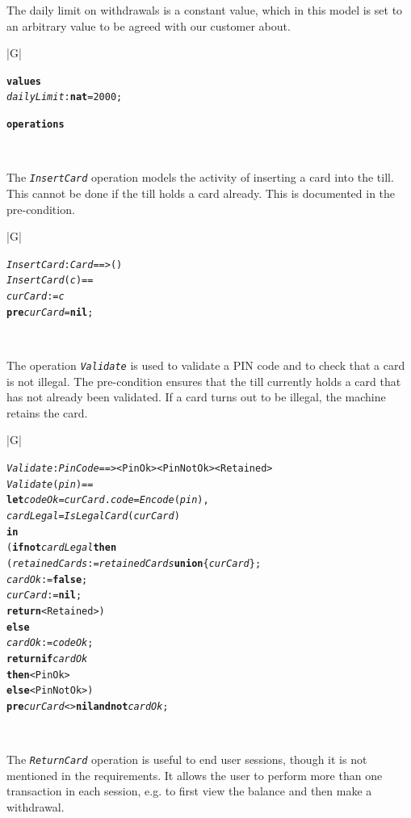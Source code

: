\documentclass[\pformat,12pt,twoside]{article}
\newenvironment{VDMgray}%
{\begin{tabular}{|G|}\hline\small\begin{alltt}}%
{\end{alltt}\normalsize\\
 \hline\end{tabular}}
\begin{document}
The daily limit on withdrawals is a constant value, which in 
this model is set to an arbitrary value to be agreed with our customer
about. 

\begin{VDMgray}
\textbf{values}
 \textit{dailyLimit} : \textbf{nat} = 2000;

\textbf{operations}
\end{VDMgray}


The \texttt{\emph{InsertCard}} operation models the activity of
inserting a card into the till. This cannot be done if the till holds
a card already.  This is documented in the pre-condition.

\begin{VDMgray}
 \textit{InsertCard} : \textit{Card} ==\texttt{>} ()
 \textit{InsertCard}(\textit{c}) ==
   \textit{curCard} := \textit{c}
 \textbf{pre} \textit{curCard} = \textbf{nil};
\end{VDMgray}


The operation \texttt{\emph{Validate}} is used to validate a PIN code and to 
check that a card is not illegal. The pre-condition ensures that 
the till currently holds a card that has not already been validated. 
If a card turns out to be illegal, the machine retains the card. 

\begin{VDMgray}
 \textit{Validate} : \textit{PinCode} ==\texttt{>} \texttt{<}PinOk\texttt{>} {\textbar} \texttt{<}PinNotOk\texttt{>} {\textbar} \texttt{<}Retained\texttt{>}
 \textit{Validate}(\textit{pin}) ==
   \textbf{let} \textit{codeOk} = \textit{curCard}.\textit{code} = \textit{Encode}(\textit{pin}),
       \textit{cardLegal} = \textit{IsLegalCard}(\textit{curCard})
   \textbf{in}
     (\textbf{if} \textbf{not} \textit{cardLegal} \textbf{then}
       (\textit{retainedCards} := \textit{retainedCards} \textbf{union} \{\textit{curCard}\};
        \textit{cardOk} := \textbf{false};
        \textit{curCard} := \textbf{nil};
        \textbf{return} \texttt{<}Retained\texttt{>})
      \textbf{else}
        \textit{cardOk} := \textit{codeOk};
     \textbf{return} \textbf{if} \textit{cardOk}
            \textbf{then} \texttt{<}PinOk\texttt{>}
            \textbf{else} \texttt{<}PinNotOk\texttt{>})
 \textbf{pre} \textit{curCard} \texttt{<}\texttt{>} \textbf{nil} \textbf{and} \textbf{not} \textit{cardOk};
\end{VDMgray}


The \texttt{\emph{ReturnCard}} operation is useful to end user sessions, though 
it is not mentioned in the requirements. It allows the user to 
perform more than one transaction in each session, e.g. to first 
view the balance and then make a withdrawal.
\end{document}
